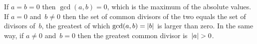 \documentclass{ibl}  %
\begin{document}
\begin{problem}
\begin{exes}
\begin{answer}
  If $a=b=0$ then $\gcd(a,b)=0$, which is the maximum of the absolute values. 
  If $a=0$ and~$b\neq 0$ then the set of 
  common divisors of the two equals the set of divisors of~$b$, 
  the greatest of which $\gcd(a,b)=\lvert b\rvert$ is larger than zero.
  In the same way, if $a\neq 0$ and~$b=0$ then the greatest common divisor 
  is~$\lvert a\rvert>0$.
\end{answer}
\end{exes} 



\end{problem}
\end{document}
